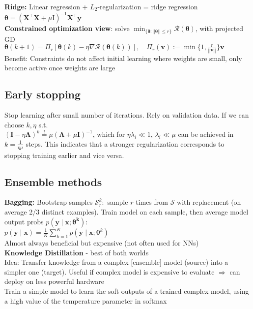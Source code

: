 \textbf{Ridge: }Linear regression + $L_2$-regularization = ridge regression \\$\pmb\theta = (\mathbf{X}^{\intercal}\mathbf{X}+\mu\mathrm{I})^{-1}\mathbf{X}^{\intercal}\mathbf{y}$\\
\textbf{Constrained optimization view}: solve $\min_{\{\pmb\theta:||\pmb\theta||\leq r\}}\mathcal R(\pmb\theta)$, with projected GD\\
$\pmb\theta(k+1)=\Pi_r[\pmb\theta(k)-\eta\nabla \mathcal R(\pmb\theta(k))],\quad \Pi_r(\mathbf v):=\min\{1,\frac{r}{||\mathbf v||}\}\mathbf v$\\
Benefit: Constraints do not affect initial learning where weights are small, only become active once weights are large
\subsection*{Early stopping}
Stop learning after small number of iterations. Rely on validation data.
If we can choose $k,\eta$ s.t.\\
$(\mathbf{I}-\eta\mathbf{\Lambda})^k \overset{!}{=} \mu(\mathbf{\Lambda}+\mu\mathbf{I})^{-1}$, which for $\eta\lambda_i \ll 1$, $\lambda_i \ll \mu$ can be achieved in $k=\frac{1}{\eta\mu}$ steps. This indicates that a stronger regularization corresponds to stopping training earlier and vice versa.
\subsection*{Ensemble methods}
\textbf{Bagging: }
Bootstrap samples $\mathcal{S}_r^k:$ sample $r$ times from $\mathcal{S}$ with replacement (on average 2/3 distinct examples). Train model on each sample, then average model output probs  $p(\mathbf{y}\mid\mathbf{x};\mathbf{\theta^k})$:\\
$p(\mathbf{y}\mid\mathbf{x}) = \frac{1}{K}\sum_{k=1}^K p(\mathbf{y}\mid\mathbf{x};\mathbf{\theta}^k)$\\
Almost always beneficial but expensive (not often used for NNs)\\
\textbf{Knowledge Distillation} - best of both worlds \\
Idea: Transfer knowledge from a complex [ensemble] model (source) into a simpler one (target). Useful if complex model is expensive to evaluate $\Rightarrow$ can deploy on less powerful hardware\\
Train a simple model to learn the soft outputs of a trained complex model, using a high value of the temperature parameter in softmax
